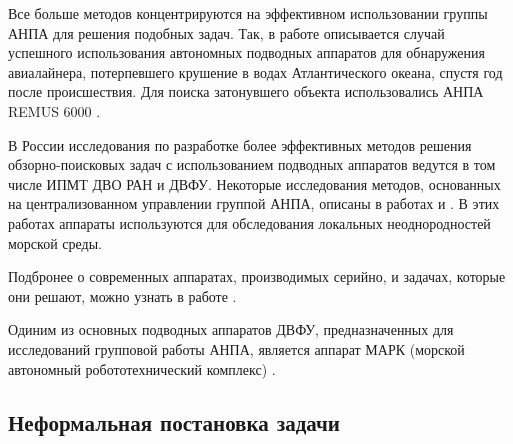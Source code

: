 \documentclass[a4paper,14pt,russian]{article}
\begin{document}
Все больше методов концентрируются на эффективном использовании группы АНПА для решения подобных задач.
Так, в работе \cite{purcell2011use} описывается случай успешного использования автономных подводных аппаратов для обнаружения авиалайнера, потерпевшего крушение в водах Атлантического океана, спустя год после происшествия. Для поиска затонувшего объекта использовались АНПА REMUS 6000 \cite{sharp2008more}.

В России исследования по разработке более эффективных методов решения обзорно-поисковых задач с использованием подводных аппаратов ведутся в том числе ИПМТ ДВО РАН и ДВФУ. Некоторые исследования методов, основанных на централизованном управлении группой АНПА, описаны в работах \cite{tuphanov1} и \cite{tuphanov2}. В этих работах аппараты используются для обследования локальных неоднородностей морской среды.

Подбронее о современных аппаратах, производимых серийно, и задачах, которые они решают, можно узнать в работе \cite{auvs}.

Одиним из основных подводных аппаратов ДВФУ, предназначенных для исследований групповой работы АНПА, является аппарат МАРК (морской автономный робототехнический комплекс) \cite{marc}.

\subsection{Неформальная постановка задачи}

\end{document}

